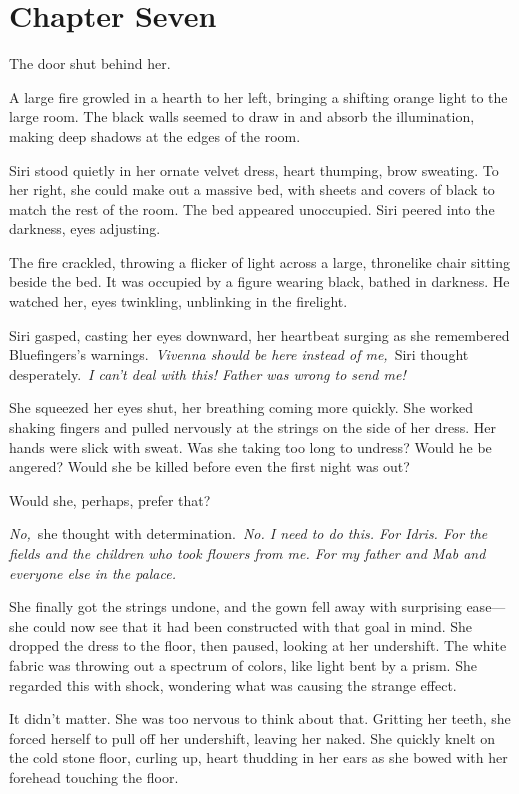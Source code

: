 \section{Chapter Seven}

The door shut behind her.

A large fire growled in a hearth to her left, bringing a shifting orange light to the large room. The black walls seemed to draw in and absorb the illumination, making deep shadows at the edges of the room.

Siri stood quietly in her ornate velvet dress, heart thumping, brow sweating. To her right, she could make out a massive bed, with sheets and covers of black to match the rest of the room. The bed appeared unoccupied. Siri peered into the darkness, eyes adjusting.

The fire crackled, throwing a flicker of light across a large, thronelike chair sitting beside the bed. It was occupied by a figure wearing black, bathed in darkness. He watched her, eyes twinkling, unblinking in the firelight.

Siri gasped, casting her eyes downward, her heartbeat surging as she remembered Bluefingers’s warnings.~\textit{Vivenna should be here instead of me,}~Siri thought desperately.~\textit{I can’t deal with this! Father was wrong to send me!}

She squeezed her eyes shut, her breathing coming more quickly. She worked shaking fingers and pulled nervously at the strings on the side of her dress. Her hands were slick with sweat. Was she taking too long to undress? Would he be angered? Would she be killed before even the first night was out?

Would she, perhaps, prefer that?

\textit{No,}~she thought with determination.~\textit{No. I need to do this. For Idris. For the fields and the children who took flowers from me. For my father and Mab and everyone else in the palace.}

She finally got the strings undone, and the gown fell away with surprising ease—she could now see that it had been constructed with that goal in mind. She dropped the dress to the floor, then paused, looking at her undershift. The white fabric was throwing out a spectrum of colors, like light bent by a prism. She regarded this with shock, wondering what was causing the strange effect.

It didn’t matter. She was too nervous to think about that. Gritting her teeth, she forced herself to pull off her undershift, leaving her naked. She quickly knelt on the cold stone floor, curling up, heart thudding in her ears as she bowed with her forehead touching the floor.

